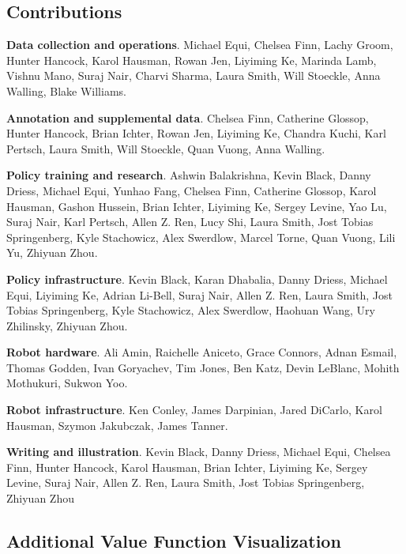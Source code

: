 \documentclass[conference]{IEEEtran}
\begin{document}
\subsection{Contributions}
\label{app:contributions}

\noindent\textbf{Data collection and operations}. Michael Equi, Chelsea Finn, Lachy Groom, Hunter Hancock, Karol Hausman, Rowan Jen, Liyiming Ke, Marinda Lamb, Vishnu Mano, Suraj Nair, Charvi Sharma, Laura Smith, Will Stoeckle, Anna Walling, Blake Williams.

\noindent\textbf{Annotation and supplemental data}. Chelsea Finn, Catherine Glossop, Hunter Hancock, Brian Ichter, Rowan Jen, Liyiming Ke, Chandra Kuchi, Karl Pertsch, Laura Smith, Will Stoeckle, Quan Vuong, Anna Walling.

\noindent\textbf{Policy training and research}. Ashwin Balakrishna, Kevin Black, Danny Driess, Michael Equi, Yunhao Fang, Chelsea Finn, Catherine Glossop, Karol Hausman, Gashon Hussein, Brian Ichter, Liyiming Ke, Sergey Levine, Yao Lu, Suraj Nair, Karl Pertsch, Allen Z. Ren, Lucy Shi, Laura Smith, Jost Tobias Springenberg, Kyle Stachowicz, Alex Swerdlow, Marcel Torne, Quan Vuong, Lili Yu, Zhiyuan Zhou.

\noindent\textbf{Policy infrastructure}. Kevin Black, Karan Dhabalia, Danny Driess, Michael Equi, Liyiming Ke, Adrian Li-Bell, Suraj Nair, Allen Z. Ren, Laura Smith, Jost Tobias Springenberg, Kyle Stachowicz, Alex Swerdlow, Haohuan Wang, Ury Zhilinsky, Zhiyuan Zhou.

\noindent\textbf{Robot hardware}. Ali Amin, Raichelle Aniceto, Grace Connors, Adnan Esmail, Thomas Godden, Ivan Goryachev, Tim Jones, Ben Katz, Devin LeBlanc, Mohith Mothukuri, Sukwon Yoo.

\noindent\textbf{Robot infrastructure}. Ken Conley, James Darpinian, Jared DiCarlo, Karol Hausman, Szymon Jakubczak, James Tanner.

\noindent\textbf{Writing and illustration}. Kevin Black, Danny Driess, Michael Equi, Chelsea Finn, Hunter Hancock, Karol Hausman, Brian Ichter, Liyiming Ke, Sergey Levine, Suraj Nair, Allen Z. Ren, Laura Smith, Jost Tobias Springenberg, Zhiyuan Zhou



\subsection{Additional Value Function Visualization}
\label{app:value}
\end{document}
